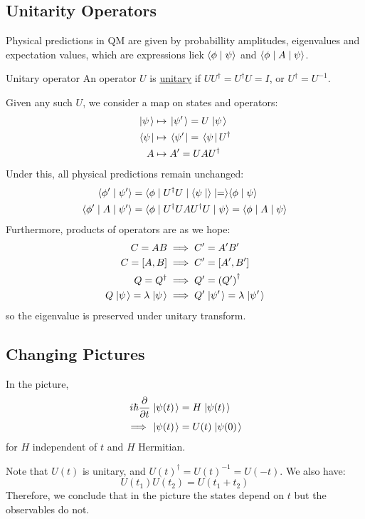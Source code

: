 \documentclass[../Main.tex]{subfiles}
\begin{document}
\subsection{Unitarity Operators}
Physical predictions in QM are given by probabillity amplitudes, eigenvalues and expectation values, which are expressions liek $\langle\phi\mid\psi\rangle$ and $\langle\phi\mid A\mid\psi\rangle$.
\begin{definition}{Unitary operator}
    An operator $U$ is \underline{unitary} if $UU^\dagger = U^\dagger U = I$, or $U^\dagger = U^{-1}$.
\end{definition}
Given any such $U$, we consider a map on states and operators:
\begin{align*}
    \left.\left|\psi\right.\right\rangle &\mapsto \left.\left|\psi'\right.\right\rangle = U\left.\left|\psi\right.\right\rangle\\
    \left.\left\langle\psi\right.\right| &\mapsto \left.\left\langle\psi'\right.\right| = \left.\left\langle\psi\right.\right| U^\dagger \\
    A &\mapsto A' = UAU^\dagger
\end{align*}
Under this, all physical predictions remain unchanged:
\begin{align*}
    \langle\phi'\mid\psi'\rangle &= \langle\phi\mid U^\dagger U\mid\langle\psi\mid\rangle\mid=\rangle \langle\phi\mid\psi\rangle \\
    \langle\phi'\mid A\mid\psi'\rangle &= \langle\phi\mid U^\dagger UAU^\dagger U\mid\psi\rangle = \langle\phi\mid A\mid\psi\rangle
\end{align*}
Furthermore, products of operators are as we hope:
\begin{align*}
    C = AB &\implies C' = A'B' \\
    C = \left[A, B\right] &\implies C' = \left[A', B'\right] \\
    Q = Q^\dagger &\implies Q' = \left(Q'\right)^\dagger \\
    Q\left.\left|\psi\right.\right\rangle = \lambda \left.\left|\psi\right.\right\rangle &\implies Q'\left.\left|\psi'\right.\right\rangle = \lambda \left.\left|\psi'\right.\right\rangle
\end{align*}
so the eigenvalue is preserved under unitary transform.
\subsection{Changing Pictures}
In the \schr picture,
\begin{align*}
    i\hbar \frac{\partial}{\partial t} \left.\left|\psi(t)\right.\right\rangle &= H\left.\left|\psi(t)\right.\right\rangle \\
    \implies \left.\left|\psi(t)\right.\right\rangle &= U(t) \left.\left|\psi(0)\right.\right\rangle
\end{align*}
for $H$ independent of $t$ and $H$ Hermitian.

Note that $U(t)$ is unitary, and $U(t)^\dagger = U(t)^{-1} = U(-t)$. We also have:
\begin{equation*}
    U(t_1) U(t_2) = U(t_1 + t_2)
\end{equation*}
Therefore, we conclude that in the \schr picture the states depend on $t$ but the observables do not.
\end{document}
